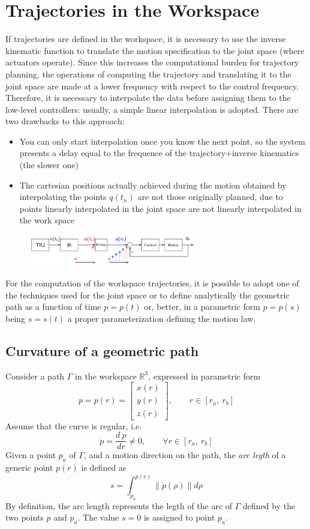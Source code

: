 \documentclass{book}
\begin{document}
\section{Trajectories in the Workspace}
If trajectories are defined in the workspace, it is necessary to use the inverse kinematic function to translate the motion specification to the joint space (where actuators operate). Since this increases the computational burden for trajectory planning, the operations of computing the trajectory and translating it to the joint space are made at a lower frequency with respect to the control frequency. Therefore, it is necessary to interpolate the data before assigning them to the low-level controllers: usually, a simple linear interpolation is adopted.
There are two drawbacks to this approach: 
\begin{itemize}
    \item You can only start interpolation once you know the next point, so the system presents a delay equal to the frequence of the trajectory+inverse kinematics (the slower one) 
    \item The cartesian positions actually achieved during the motion obtained by interpolating the points $q(t_n)$ are not those originally planned, due to points linearly interpolated in the joint space are not linearly interpolated in the work space
\end{itemize}
\begin{figure}[H]
    \begin{center}
        \includegraphics[width=0.65\textwidth]{worktraj}
    \end{center}
\end{figure}

For the computation of the workspace trajectories, it is possible to adopt one of the techniques used for the joint space or to define analytically the geometric path as a function of time $p=p(t)$ or, better, in a parametric form $p=p(s)$ being $s=s(t)$ a proper parameterization defining the motion law.
\subsection{Curvature of a geometric path}
Consider a path $\Gamma$ in the workspace $\mathbb{R}^3$, expressed in parametric form 
\[
    p=p(r) = \begin{bmatrix}
        x(r) \\ y(r) \\ z(r)
    \end{bmatrix}, \qquad r\in [r_a,~r_b]
\]
Assume that the curve is regular, i.e.
\[
    \dot{p} = \displaystyle\frac{d~p}{dr} \neq 0, \qquad \forall r \in [r_a,~r_b]
\]
Given a point $p_a$ of $\Gamma$, and a motion direction on the path, the \emph{arc legth} of a generic point $p(r)$ is defined as 
\[
    s = \displaystyle\int_{p_a}^{p(r)}\|\dot{p}(\rho)\|d\rho
\]
By definition, the arc length represents the legth of the arc of $\Gamma$ defined by the two points $p$ and $p_a$. The value $s=0$ is assigned to point $p_a$. 
\end{document}
